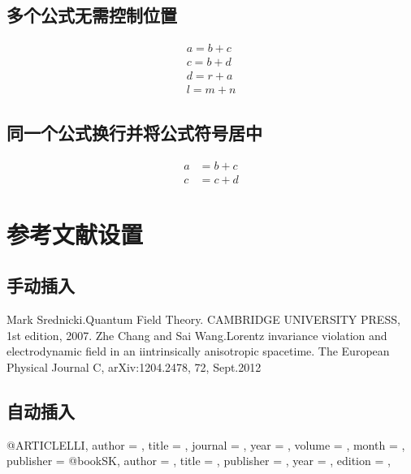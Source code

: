 \documentclass[11pt,onecolumn,a4paper]{ctexart}
\begin{document}
\subsection{多个公式无需控制位置}
\begin{gather}
	a=b+c\\
	c=b+d\\
	d=r+a\\
	l=m+n
\end{gather}
\subsection{同一个公式换行并将公式符号居中}
\begin{equation}
	\begin{aligned}
		a & =b+c \\
		c & =c+d
	\end{aligned}
\end{equation}


\section{参考文献设置}
\subsection{手动插入}
\begin{thebibliography}{99}
	Mark Srednicki.Quantum Field Theory.
	CAMBRIDGE UNIVERSITY PRESS, 1st edition, 2007.
	Zhe Chang and Sai Wang.Lorentz invariance violation
	and electrodynamic field in an iintrinsically
	anisotropic spacetime.
	The European Physical Journal C,
	arXiv:1204.2478, 72, Sept.2012
\end{thebibliography}

\subsection{自动插入}

@ARTICLE{LLI,
	author = {},
	title = {},
	journal = {},
	year = {},
	volume = {},
	month = {},
	publisher = {}
}
@book{SK,
	author = {},
	title = {},
	publisher = {},
	year = {},
	edition = {},
}


\cite{SK}
\nocite{LLI}
\end{document}
